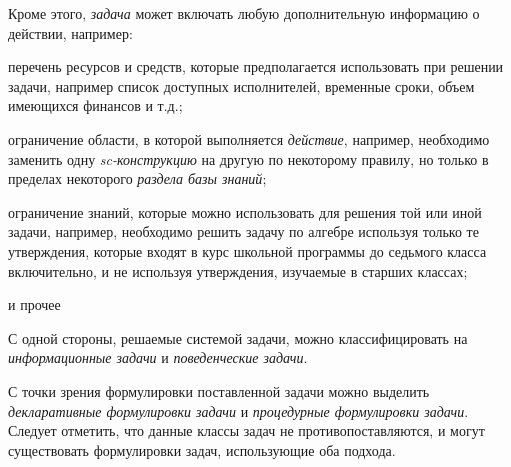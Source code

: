 \begin{SCn}
{Кроме этого, \textit{задача} может включать любую дополнительную информацию о действии, например:
\begin{scnitemize}
    \item перечень ресурсов и средств, которые предполагается использовать при решении задачи, например список доступных исполнителей, временные сроки, объем имеющихся финансов и т.д.;
    \item ограничение области, в которой выполняется \textit{действие}, например, необходимо заменить одну \textit{sc-конструкцию} на другую по некоторому правилу, но только в пределах некоторого \textit{раздела базы знаний};
    \item ограничение знаний, которые можно использовать для решения той или иной задачи, например, необходимо решить задачу по алгебре используя только те утверждения, которые входят в курс школьной программы до седьмого класса включительно, и не используя утверждения, изучаемые в старших классах;
    \item и прочее
\end{scnitemize}
С одной стороны, решаемые системой задачи, можно классифицировать на \textit{информационные задачи} и \textit{поведенческие задачи}. 

С точки зрения формулировки поставленной задачи можно выделить \textit{декларативные формулировки задачи} и \textit{процедурные формулировки задачи}. Следует отметить, что данные классы задач не противопоставляются, и могут существовать формулировки задач, использующие оба подхода.}


\end{SCn}

